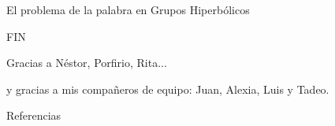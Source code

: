 \documentclass[xcolor=dvipsnames,aspectratio=159]{beamer}
\theoremstyle{largebreak}
\begin{document}
\begin{frame}{El problema de la palabra en Grupos Hiperbólicos}
    \begin{center}
        \Huge FIN
    \end{center}

    \pause

    \begin{center}
        Gracias a Néstor, Porfirio, Rita...
    \end{center}

    \pause

    \begin{center}
        y gracias a mis compañeros de equipo: Juan, Alexia, Luis y Tadeo.
    \end{center}
    
\end{frame}

\begin{frame}{Referencias}
    \footnotesize
    
    
    \nocite{*}
\end{frame}
\end{document}
